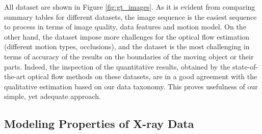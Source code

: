 All dataset are shown in Figure \ref{fig:gt_images}. As it is evident from comparing summary tables for different datasets, the \mar image sequence is the easiest sequence to process in terms of image quality, data features and motion model. On the other hand, the \rub dataset impose more challenges for the optical flow estimation (different motion types, occlusions), and the \hyd dataset is the most challenging in terms of accuracy of the results on the boundaries of the moving object or their parts. Indeed, the inspection of the quantitative results, obtained by the state-of-the-art optical flow methods on these datasets, are in a good agreement with the qualitative estimation based on our data taxonomy. This proves usefulness of our simple, yet adequate approach.    


%


%


\subsection{Modeling Properties of X-ray Data}
\label{modeling_xray_data}

